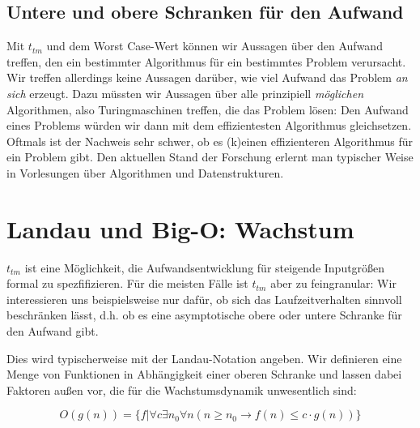 \subsection{Untere und obere Schranken für den Aufwand}
Mit $t_{tm}$ und dem Worst Case-Wert können wir Aussagen über den Aufwand treffen,
den ein bestimmter Algorithmus für ein bestimmtes Problem verursacht.
Wir treffen allerdings keine Aussagen darüber,
wie viel Aufwand das Problem \emph{an sich} erzeugt.
Dazu müssten wir Aussagen über alle prinzipiell \emph{möglichen} Algorithmen,
also Turingmaschinen treffen,
die das Problem lösen:
Den Aufwand eines Problems würden wir dann mit dem effizientesten Algorithmus gleichsetzen.
Oftmals ist der Nachweis sehr schwer,
ob es (k)einen effizienteren Algorithmus
für ein Problem gibt.
Den aktuellen Stand der Forschung erlernt man typischer Weise in Vorlesungen über
Algorithmen und Datenstrukturen.


\section{Landau und Big-O: Wachstum}

$t_{tm}$ ist eine Möglichkeit,
die Aufwandsentwicklung für steigende Inputgrößen formal zu spezfifizieren.
Für die meisten Fälle ist $t_{tm}$ aber zu feingranular:
Wir interessieren uns beispielsweise nur dafür,
ob sich das Laufzeitverhalten sinnvoll beschränken lässt,
d.h. ob es eine asymptotische obere oder untere Schranke für den Aufwand gibt.

Dies wird typischerweise mit der Landau-Notation angeben.
Wir definieren eine Menge von Funktionen in Abhängigkeit einer oberen Schranke
und lassen dabei Faktoren außen vor,
die für die Wachstumsdynamik unwesentlich sind:

\[
O(g(n)) = \{f|\forall c \exists n_0 \forall n (n \geq n_0 \rightarrow f(n) \leq c \cdot g(n))\}
\]

